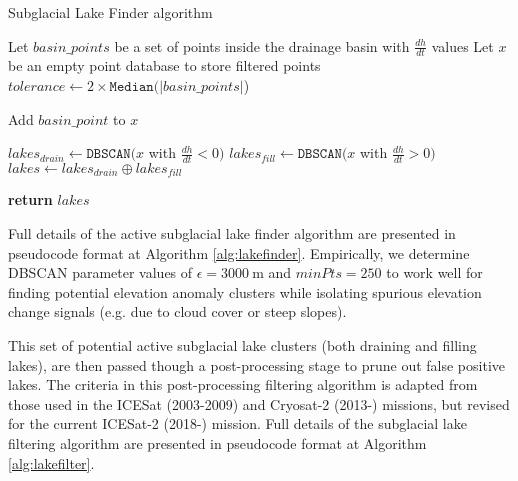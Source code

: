 \begin{algorithm}
  \caption{Subglacial Lake Finder algorithm}\label{alg:lakefinder}
  \begin{algorithmic}

      \State Let $basin\_points$ be a set of points inside the drainage basin with $\frac{dh}{dt}$ values %
      \State Let $x$ be an empty point database to store filtered points
      \State $tolerance \gets 2 \times \texttt{Median}(\lvert basin\_points \rvert$)

           
            \State Add $basin\_point$ to $x$
          \EndIf
        \EndFor

      \State $lakes_{drain} \gets \texttt{DBSCAN}(x$ with $\frac{dh}{dt} < 0)$ 
      \State $lakes_{fill} \gets \texttt{DBSCAN}(x$ with $\frac{dh}{dt} > 0)$ 
      \State $lakes \gets lakes_{drain} \oplus lakes_{fill}$ 

      \State \textbf{return} $lakes$
     \EndFor
  \end{algorithmic}
\end{algorithm}

Full details of the active subglacial lake finder algorithm are presented in pseudocode format at Algorithm \ref{alg:lakefinder}.
Empirically, we determine DBSCAN parameter values of $\epsilon=\SI{3000}{\metre}$ and $minPts=250$ to work well for finding potential elevation anomaly clusters while isolating spurious elevation change signals (e.g. due to cloud cover or steep slopes).

This set of potential active subglacial lake clusters (both draining and filling lakes), are then passed though a post-processing stage to prune out false positive lakes.
The criteria in this post-processing filtering algorithm is adapted from those used in the ICESat (2003-2009) \citep{FrickerActiveSubglacialWater2007,Smithinventoryactivesubglacial2009} and Cryosat-2 (2013-) \citep[e.g.][]{KimActivesubglaciallakes2016,SiegfriedThirteenyearssubglacial2018} missions, but revised for the current ICESat-2 (2018-) mission.
Full details of the subglacial lake filtering algorithm are presented in pseudocode format at Algorithm \ref{alg:lakefilter}.

